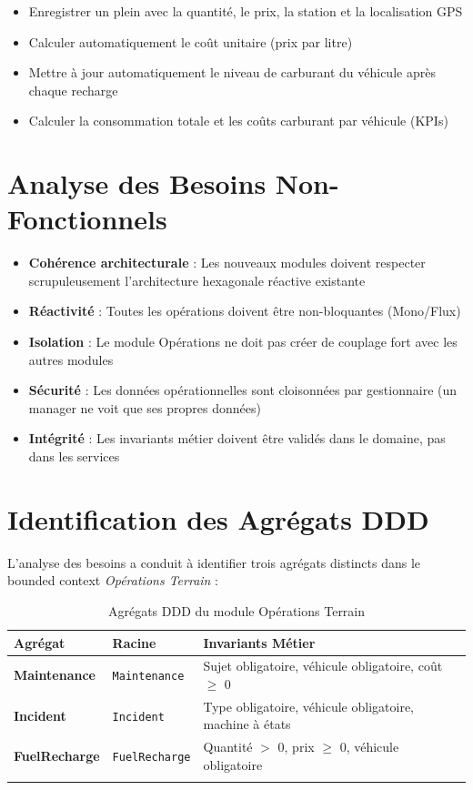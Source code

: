 \documentclass[12pt,a4paper]{report}
\begin{document}
\begin{itemize}[leftmargin=2cm]
  \item Enregistrer un plein avec la quantité, le prix, la station et la localisation GPS
  \item Calculer automatiquement le coût unitaire (prix par litre)
  \item Mettre à jour automatiquement le niveau de carburant du véhicule après chaque recharge
  \item Calculer la consommation totale et les coûts carburant par véhicule (KPIs)
\end{itemize}

\section{Analyse des Besoins Non-Fonctionnels}

\begin{itemize}[leftmargin=2cm]
  \item \textbf{Cohérence architecturale} : Les nouveaux modules doivent respecter scrupuleusement l'architecture hexagonale réactive existante
  \item \textbf{Réactivité} : Toutes les opérations doivent être non-bloquantes (Mono/Flux)
  \item \textbf{Isolation} : Le module Opérations ne doit pas créer de couplage fort avec les autres modules
  \item \textbf{Sécurité} : Les données opérationnelles sont cloisonnées par gestionnaire (un manager ne voit que ses propres données)
  \item \textbf{Intégrité} : Les invariants métier doivent être validés dans le domaine, pas dans les services
\end{itemize}

\section{Identification des Agrégats DDD}

L'analyse des besoins a conduit à identifier trois agrégats distincts dans le bounded context \textit{Opérations Terrain} :

\begin{longtable}{p{3cm}p{3cm}p{7cm}}
\toprule
\textbf{Agrégat} & \textbf{Racine} & \textbf{Invariants Métier} \\
\midrule
\endhead
\textbf{Maintenance} & \texttt{Maintenance} & Sujet obligatoire, véhicule obligatoire, coût $\geq$ 0 \\
\textbf{Incident} & \texttt{Incident} & Type obligatoire, véhicule obligatoire, machine à états \\
\textbf{FuelRecharge} & \texttt{FuelRecharge} & Quantité $>$ 0, prix $\geq$ 0, véhicule obligatoire \\
\bottomrule
\caption{Agrégats DDD du module Opérations Terrain}
\end{longtable}
\end{document}
